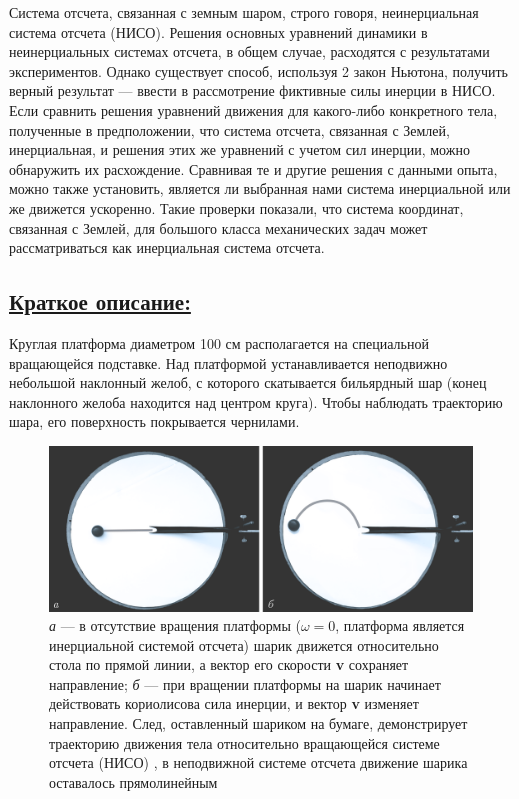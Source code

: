 \documentclass[14pt,a4paper,oneside]{extarticle}	%
\begin{document}
		Система отсчета, связанная с земным шаром, строго говоря, неинерциальная система отсчета (НИСО).
		Решения основных уравнений динамики в неинерциальных системах отсчета, в общем случае, расходятся с результатами экспериментов. Однако существует способ, используя 2 закон Ньютона, получить верный результат — ввести в рассмотрение фиктивные силы инерции в НИСО. Если сравнить решения уравнений движения для какого-либо конкретного тела, полученные в предположении, что система отсчета, связанная с Землей, инерциальная, и решения этих же уравнений с учетом сил инерции, можно обнаружить их расхождение.
		Сравнивая те и другие решения с данными опыта, можно также установить, является ли выбранная нами система инерциальной или же движется ускоренно.
		Такие проверки показали, что система координат, связанная с Землей, для большого класса механических задач может рассматриваться как инерциальная система отсчета.	
	
	
	\subsection*{\underline{Краткое описание:}}
	
Круглая платформа диаметром 100 см располагается на специальной вращающейся подставке. 
Над платформой устанавливается неподвижно небольшой наклонный желоб, с которого 
скатывается бильярдный шар (конец наклонного желоба находится над центром круга). 
Чтобы наблюдать траекторию шара, его поверхность покрывается чернилами.

\begin{figure}[H] 	
	\centering 	
	\includegraphics[width=0.9\linewidth]{Coriolis-2.png}
	\caption{\textit{а} — в отсутствие вращения платформы ($ \omega=0 $, платформа является инерциальной системой отсчета) шарик движется относительно стола по прямой линии, а вектор его скорости \textbf{v} сохраняет направление; \textit{б} — при вращении платформы на шарик начинает действовать кориолисова сила инерции, и вектор \textbf{v} изменяет направление. След, оставленный шариком на бумаге, демонстрирует траекторию движения тела относительно вращающейся системе отсчета (НИСО) , в неподвижной системе отсчета движение шарика оставалось прямолинейным}
	\label{Coriolis-2}
\end{figure}
\end{document}
